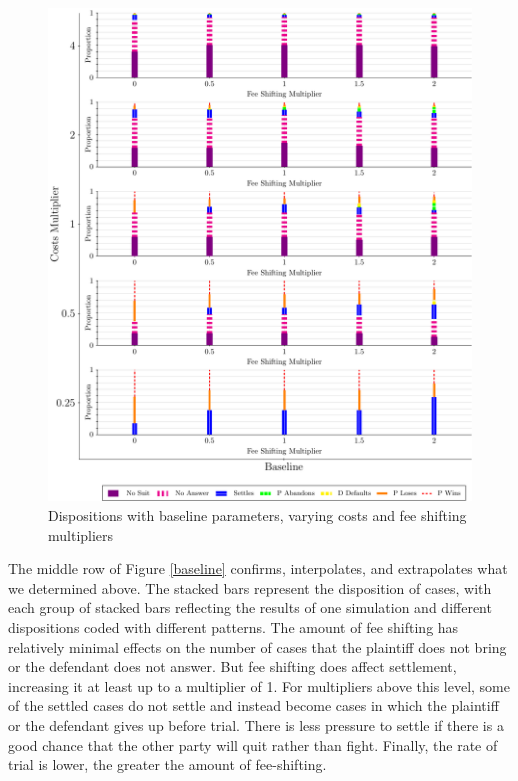 \documentclass{article}
\begin{document}
\begin{figure}[h!]
\centering
\includegraphics[scale=0.50, trim={0in 0in 0in 0in}, clip]{../Figures/Disposition Baseline.pdf}
\caption{Dispositions with baseline parameters, varying costs and fee shifting multipliers}
\label{fig:disposition_baseline}
\end{figure}

The middle row of Figure \ref{baseline} confirms, interpolates, and extrapolates what we determined above. The stacked bars represent the disposition of cases, with each group of stacked bars reflecting the results of one simulation and different dispositions coded with different patterns. The amount of fee shifting has relatively minimal effects on the number of cases that the plaintiff does not bring or the defendant does not answer. But fee shifting does affect settlement, increasing it at least up to a multiplier of 1. For multipliers above this level, some of the settled cases do not settle and instead become cases in which the plaintiff or the defendant gives up before trial. There is less pressure to settle if there is a good chance that the other party will quit rather than fight. Finally, the rate of trial is lower, the greater the amount of fee-shifting. 
\end{document}
